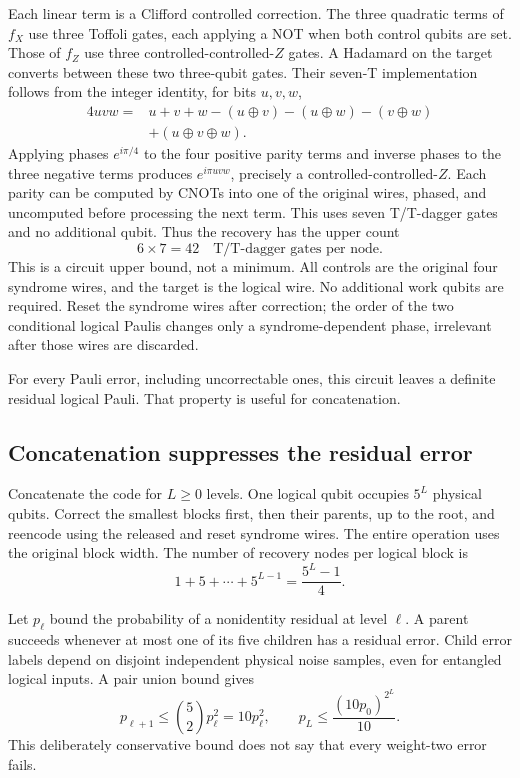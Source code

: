 \documentclass[11pt,a4paper]{article}
\numberwithin{equation}{section}
\theoremstyle{remark}\newtheorem*{remark}{Interpretation}
\newcommand{\xor}{\oplus}
\begin{document}
Each linear term is a Clifford controlled correction. The three quadratic terms of $f_X$ use three Toffoli gates, each applying a NOT when both control qubits are set. Those of $f_Z$ use three controlled-controlled-$Z$ gates. A Hadamard on the target converts between these two three-qubit gates. Their seven-T implementation follows from the integer identity, for bits $u,v,w$,
\begin{align*}
4uvw={}&u+v+w-(u\xor v)-(u\xor w)-(v\xor w)\\
&+(u\xor v\xor w).
\end{align*}
Applying phases $e^{i\pi/4}$ to the four positive parity terms and inverse phases to the three negative terms produces $e^{i\pi uvw}$, precisely a controlled-controlled-$Z$. Each parity can be computed by CNOTs into one of the original wires, phased, and uncomputed before processing the next term. This uses seven T/T-dagger gates and no additional qubit. Thus the recovery has the upper count
\begin{equation}
\boxed{6\times7=42\quad\text{T/T-dagger gates per node}.}
\end{equation}
This is a circuit upper bound, not a minimum. All controls are the original four syndrome wires, and the target is the logical wire. No additional work qubits are required. Reset the syndrome wires after correction; the order of the two conditional logical Paulis changes only a syndrome-dependent phase, irrelevant after those wires are discarded.

For every Pauli error, including uncorrectable ones, this circuit leaves a definite residual logical Pauli. That property is useful for concatenation.

\subsection{Concatenation suppresses the residual error}
Concatenate the code for $L\ge0$ levels. One logical qubit occupies $5^L$ physical qubits. Correct the smallest blocks first, then their parents, up to the root, and reencode using the released and reset syndrome wires. The entire operation uses the original block width. The number of recovery nodes per logical block is
\begin{equation}
1+5+\cdots+5^{L-1}=\frac{5^L-1}{4}.
\end{equation}

Let $p_\ell$ bound the probability of a nonidentity residual at level $\ell$. A parent succeeds whenever at most one of its five children has a residual error. Child error labels depend on disjoint independent physical noise samples, even for entangled logical inputs. A pair union bound gives
\begin{equation}
p_{\ell+1}\le\binom52p_\ell^2=10p_\ell^2,
\qquad
p_L\le\frac{(10p_0)^{2^L}}{10}.
\end{equation}
This deliberately conservative bound does not say that every weight-two error fails.
\end{document}
